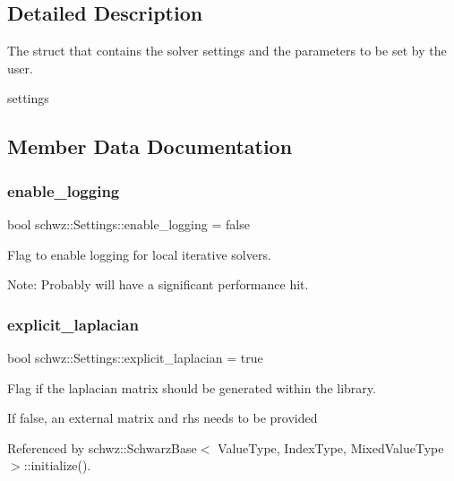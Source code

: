 \subsection{Detailed Description}
The struct that contains the solver settings and the parameters to be set by the user. 

settings 

\subsection{Member Data Documentation}
\mbox{\label{structschwz_1_1Settings_a2b683340720aadaba85255580483f684}} 
\subsubsection{\texorpdfstring{enable\+\_\+logging}{enable\_logging}}
{\footnotesize\ttfamily bool schwz\+::\+Settings\+::enable\+\_\+logging = false}



Flag to enable logging for local iterative solvers. 

Note\+: Probably will have a significant performance hit. \mbox{\label{structschwz_1_1Settings_a2af5f07901df047e305c456b2f97e774}} 
\subsubsection{\texorpdfstring{explicit\+\_\+laplacian}{explicit\_laplacian}}
{\footnotesize\ttfamily bool schwz\+::\+Settings\+::explicit\+\_\+laplacian = true}



Flag if the laplacian matrix should be generated within the library. 

If false, an external matrix and rhs needs to be provided 

Referenced by schwz\+::\+Schwarz\+Base$<$ Value\+Type, Index\+Type, Mixed\+Value\+Type $>$\+::initialize().

\mbox{\label{structschwz_1_1Settings_a8028fcf029fadc07a7d1b9aa94c83f08}} 
